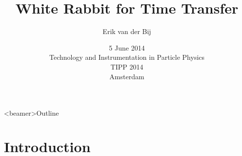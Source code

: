 \documentclass[compress,red]{beamer}
\title[White Rabbit for Time Transfer \hspace{2em}\insertframenumber/\inserttotalframenumber]
{White Rabbit for Time Transfer}
\institute{
   \begin{center}
    Hardware and Timing Section  \\
    CERN\\
   \end{center}
}
\author{
Erik van der Bij
}
\date{5 June 2014\\Technology and Instrumentation in Particle Physics \\TIPP 2014\\Amsterdam}
\begin{document}
\frame{\titlepage}
\begin{frame}<beamer>{Outline}
    \tableofcontents %
\end{frame}

\section{Introduction}
\subsection{}
\end{document}
